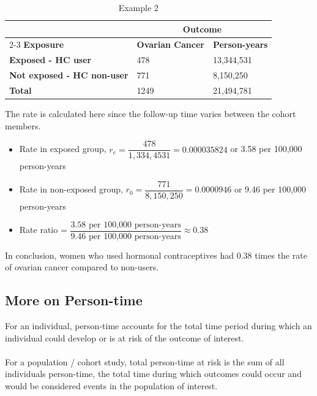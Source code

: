 \documentclass{article}
\begin{document}
\begin{table}[H]
\centering
\begin{tabularx}{\textwidth}{|X|X|X|}
\hline
& \multicolumn{2}{c|}{\textbf{Outcome}} \\ \cline{2-3}
\textbf{Exposure} & \textbf{Ovarian Cancer} & \textbf{Person-years} \\ \hline
\textbf{Exposed - HC user} & 478 & 13,344,531 \\ \hline
\textbf{Not exposed - HC non-user} & 771 & 8,150,250 \\ \hline
\textbf{Total} & 1249 & 21,494,781 \\ \hline
\end{tabularx}
\caption{Example 2}
\label{tab:example-2}
\end{table}

The rate is calculated here since the follow-up time varies between the cohort members.
\begin{itemize}
    \item Rate in exposed group, $r_e = \dfrac{478}{1,334,4531} = 0.000035824$ or 3.58 per 100,000 person-years
    \item Rate in non-exposed group, $r_0 = \dfrac{771}{8,150,250} = 0.0000946$ or 9.46 per 100,000 person-years
    \item Rate ratio = $\dfrac{3.58 \text{ per 100,000 person-years}}{9.46 \text{ per 100,000 person-years}} \approx 0.38$
\end{itemize}
In conclusion, women who used hormonal contraceptives had 0.38 times the rate of ovarian cancer compared to non-users.

\subsection{More on Person-time}
For an individual, person-time accounts for the total time period during which an individual could develop or is at risk of the outcome of interest.
\\~\\
For a population / cohort study, total person-time at risk is the sum of all individuals person-time, the total time during which outcomes could occur and would be considered events in the population of interest.
\end{document}
